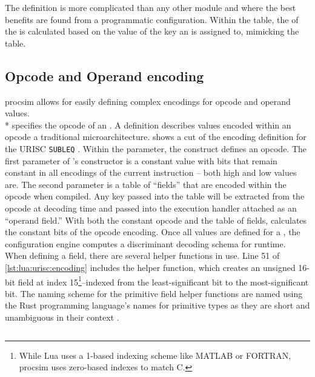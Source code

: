 The  definition is more complicated than any other module and where the best benefits are found from a programmatic configuration. Within the  table, the  of the  is calculated based on the value of the key an  is assigned to, mimicking the  table. 

\subsection{Opcode and Operand encoding}

procsim allows for easily defining complex encodings for opcode and operand values. \\*  specifies the opcode of an . A  definition describes values encoded within an opcode a traditional microarchitecture.  shows a cut of the encoding definition for the URISC \texttt{SUBLEQ} . Within the  parameter, the  construct defines an opcode. The first parameter of 's constructor is a constant value with bits that remain constant in all encodings of the current instruction -- both high and low values are. The second parameter is a table of ``fields'' that are encoded within the opcode when compiled. Any key passed into the table will be extracted from the opcode at decoding time and passed into the execution handler attached as an ``operand field.'' With both the constant opcode and the table of fields,  calculates the constant bits of the opcode encoding. Once all  values are defined for a , the configuration engine computes a discriminant decoding schema for runtime. When defining a field, there are several helper functions in use. Line 51 of \cref{lst:lua:urisc:encoding} includes the helper function,  which creates an unsigned 16-bit field at index 15\footnote{While Lua uses a 1-based indexing scheme like MATLAB or FORTRAN, procsim uses zero-based indexes to match C.}--indexed from the least-significant bit to the most-significant bit. The naming scheme for the primitive field helper functions are named using the Rust programming language's names for primitive types as they are short and unambiguous in their context \cite{Rust:PrimitiveTypes:Numeric}.

\begin{listing}[hb!]
    \inputminted[escapeinside=||, firstline=48, lastline=59]{lua}{./listings/urisc.lua}
    \caption{Encoding of the opcode and operands of the \texttt{SUBLEQ}  (cut from \cref{lst:lua:urisc-example-1}).}
    \label{lst:lua:urisc:encoding}
\end{listing}

